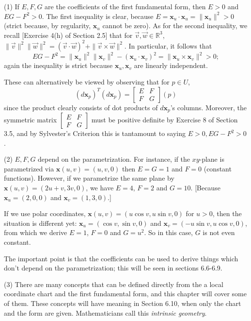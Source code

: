 \documentclass[leqno]{book}
\begin{document}
(1) If $E,F,G$ are the coefficients of the first fundamental form, then $E>0$ and $EG-F^2>0$.  The first inequality is clear, because $E=\mathbf x_u\cdot\mathbf x_u=\|\mathbf x_u\|^2>0$ (strict because, by regularity, $\mathbf x_u$ cannot be zero).  As for the second inequality, we recall [Exercise 4(h) of Section 2.5] that for $\vec v,\vec w\in\mathbb R^3$, $\|\vec v\|^2\|\vec w\|^2=(\vec v\cdot\vec w)^2+\|\vec v\times\vec w\|^2$.  In particular, it follows that
$$EG-F^2=\|\mathbf x_u\|^2\|\mathbf x_v\|^2-(\mathbf x_u\cdot\mathbf x_v)^2=\|\mathbf x_u\times\mathbf x_v\|^2>0;$$
again the inequality is strict because $\mathbf x_u,\mathbf x_v$ are linearly independent.

These can alternatively be viewed by observing that for $p\in U$,
$$(d\mathbf x_p)^T(d\mathbf x_p)=\begin{bmatrix}E&F\\F&G\end{bmatrix}(p)$$
since the product clearly consists of dot products of $d\mathbf x_p$'s columns.  Moreover, the symmetric matrix $\begin{bmatrix}E&F\\F&G\end{bmatrix}$ must be positive definite by Exercise 8 of Section 3.5, and by Sylvester's Criterion this is tantamount to saying $E>0,EG-F^2>0$.

(2) $E,F,G$ depend on the parametrization.  For instance, if the $xy$-plane is parametrized via $\mathbf x(u,v)=(u,v,0)$ then $E=G=1$ and $F=0$ (constant functions).  However, if we parametrize the same plane by $\mathbf x(u,v)=(2u+v,3v,0)$, we have $E=4$, $F=2$ and $G=10$.  [Because $\mathbf x_u=(2,0,0)$ and $\mathbf x_v=(1,3,0)$.]

If we use polar coordinates, $\mathbf x(u,v)=(u\cos v,u\sin v,0)$ for $u>0$, then the situation is different yet: $\mathbf x_u=(\cos v,\sin v,0)$ and $\mathbf x_v=(-u\sin v,u\cos v,0)$, from which we derive $E=1$, $F=0$ and $G=u^2$.  So in this case, $G$ is not even constant.

The important point is that the coefficients can be used to derive things which don't depend on the parametrization; this will be seen in sections 6.6-6.9.

(3) There are many concepts that can be defined directly from the a local coordinate chart and the first fundamental form, and this chapter will cover some of them.  These concepts will have meaning in Section 6.10, when only the chart and the form are given.  Mathematicians call this \emph{intrinsic geometry}.\\
\end{document}
